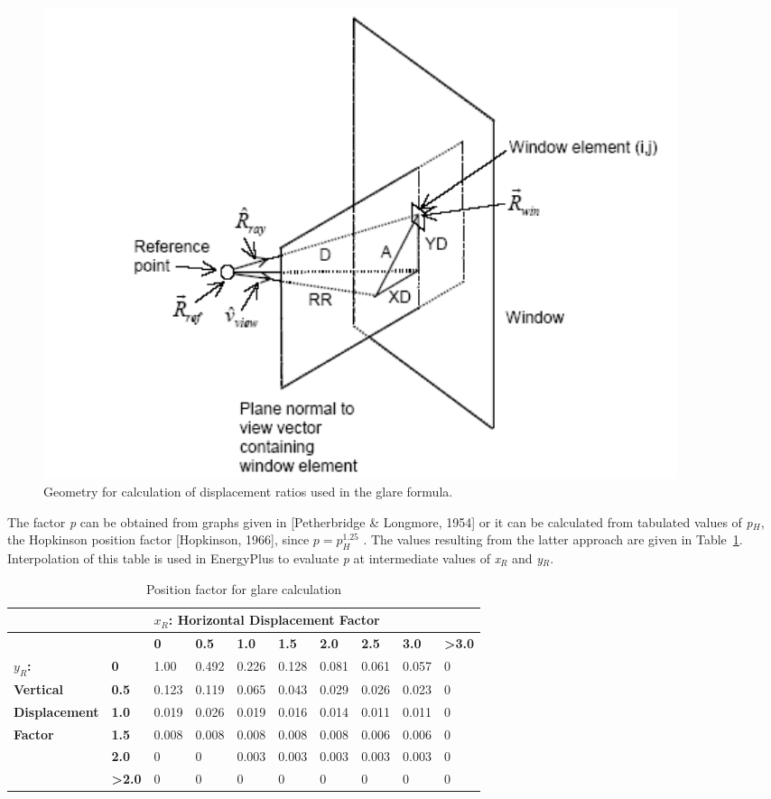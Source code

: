 \begin{figure}[hbtp] %
\centering
\includegraphics[width=0.9\textwidth, height=0.9\textheight, keepaspectratio=true]{media/image794.png}
\caption{  Geometry for calculation of displacement ratios used in the glare formula. \protect \label{fig:geometry-for-calculation-of-displacement}}
\end{figure}

The factor \emph{p} can be obtained from graphs given in {[}Petherbridge \& Longmore, 1954{]} or it can be calculated from tabulated values of \emph{p\(_{H}\)}, the Hopkinson position factor {[}Hopkinson, 1966{]}, since \(p = p_H^{1.25}\) . The values resulting from the latter approach are given in Table~\ref{table:position-factor-for-glare-calculation}. Interpolation of this table is used in EnergyPlus to evaluate \emph{p} at intermediate values of \emph{x\(_{R}\)} and \emph{y\(_{R}\)}.

\begin{longtable}[c]{p{1.0in}p{0.4in}p{0.4in}p{0.4in}p{0.4in}p{0.4in}p{0.4in}p{0.4in}p{0.4in}p{0.4in}}
\caption{Position factor for glare calculation \label{table:position-factor-for-glare-calculation}}\\
\toprule 
						&      &\multicolumn{8}{l}{$x_R$: Horizontal Displacement Factor} \tabularnewline \cmidrule(r){2-9} \endhead
						&      & \textbf{0}     & \textbf{0.5}   & \textbf{1.0}   & \textbf{1.5}   & \textbf{2.0}   & \textbf{2.5}   & \textbf{3.0}   & \textbf{>3.0} \tabularnewline
\textbf{$y_R$:}			& \textbf{0}    & 1.00  & 0.492 & 0.226 & 0.128 & 0.081 & 0.061 & 0.057 & 0 \tabularnewline
\textbf{Vertical}		& \textbf{0.5}  & 0.123 & 0.119 & 0.065 & 0.043 & 0.029 & 0.026 & 0.023 & 0 \tabularnewline
\textbf{Displacement}	& \textbf{1.0}  & 0.019 & 0.026 & 0.019 & 0.016 & 0.014 & 0.011 & 0.011 & 0 \tabularnewline
\textbf{Factor}			& \textbf{1.5}  & 0.008 & 0.008 & 0.008 & 0.008 & 0.008 & 0.006 & 0.006 & 0 \tabularnewline
						& \textbf{2.0}  & 0     & 0     & 0.003 & 0.003 & 0.003 & 0.003 & 0.003 & 0 \tabularnewline
						& \textbf{>2.0} & 0     & 0     & 0     & 0     & 0     & 0     & 0     & 0 \tabularnewline
\bottomrule
\end{longtable}

